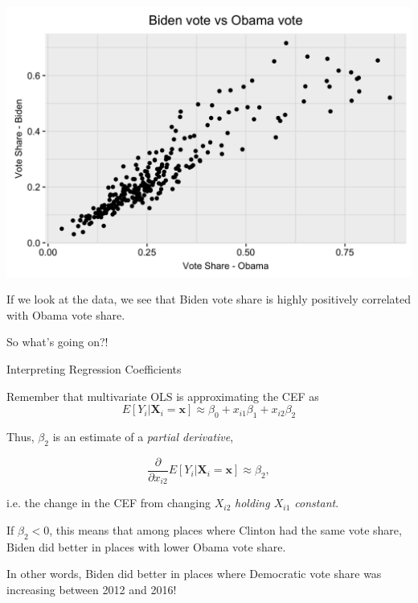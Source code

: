 \documentclass[11pt,english,handout]{beamer}
\newenvironment{wideitemize}{\itemize\addtolength{\itemsep}{10pt}}{\enditemize}
\begin{document}
	\begin{frame}
		\begin{center}
		\includegraphics[width = 0.7 \linewidth]{biden-obama}
		\end{center}
		\begin{wideitemize}
		\item
		If we look at the data, we see that Biden vote share is highly positively correlated with Obama vote share.
		
		\item
		So what's going on?!
	\end{wideitemize}
	\end{frame}
	
	\begin{frame}{Interpreting Regression Coefficients}
		\begin{wideitemize}
			\item
			Remember that multivariate OLS is approximating the CEF as
			$$E[Y_i | \bm{X}_i = \bm{x}] \approx \beta_0 +  x_{i1} \beta_1 + x_{i2} \beta_2 $$
			
			\pause
			\item
			Thus, $\beta_2$ is an estimate of a \textit{partial derivative},
			
			$$\dfrac{\partial }{\partial x_{i2}}  E[Y_i | \bm{X}_i = \bm{x}] \approx \beta_2 ,$$
			
			\noindent i.e. the change in the CEF from changing $X_{i2}$ \textit{holding $X_{i1}$ constant}. 
			
			\pause
			\item
			If $\beta_2 < 0$, this means that among places where Clinton had the same vote share, Biden did better in places with lower Obama vote share.
			
			\pause
			\item
			In other words, Biden did better in places where Democratic vote share was increasing between 2012 and 2016!
		\end{wideitemize}	
	\end{frame}
\end{document}
